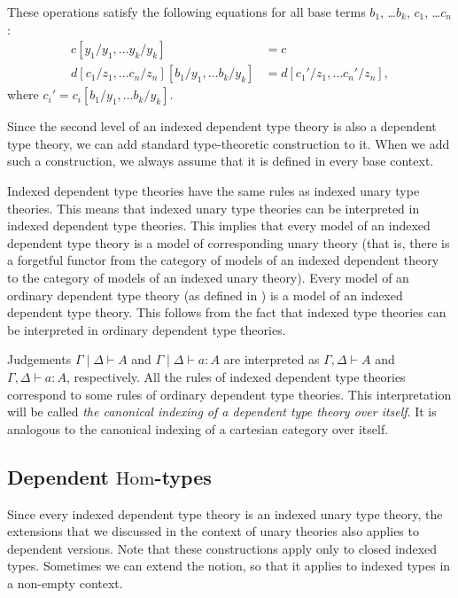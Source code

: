 \documentclass[reqno]{amsart}
\theoremstyle{definition}
\theoremstyle{remark}
\newcommand{\type}{}
\newcommand{\ob}{}
\newcommand{\fs}[1]{\mathrm{#1}}
\newcommand{\Hom}{\fs{Hom}}
\numberwithin{figure}{section}
\begin{document}
These operations satisfy the following equations for all base terms $b_1$, \ldots $b_k$, $c_1$, \ldots $c_n$:
\begin{align*}
c[y_1/y_1, \ldots y_k/y_k] & = c \\
d[c_1/z_1, \ldots c_n/z_n][b_1/y_1, \ldots b_k/y_k] & = d[c_1'/z_1, \ldots c_n'/z_n],
\end{align*}
where $c_i' = c_i[b_1/y_1, \ldots b_k/y_k]$.

Since the second level of an indexed dependent type theory is also a dependent type theory,
we can add standard type-theoretic construction to it.
When we add such a construction, we always assume that it is defined in every base context.

Indexed dependent type theories have the same rules as indexed unary type theories.
This means that indexed unary type theories can be interpreted in indexed dependent type theories.
This implies that every model of an indexed dependent type theory is a model of corresponding unary theory
(that is, there is a forgetful functor from the category of models of an indexed dependent theory to the category of models of an indexed unary theory).
Every model of an ordinary dependent type theory (as defined in \cite{alg-tt}) is a model of an indexed dependent type theory.
This follows from the fact that indexed type theories can be interpreted in ordinary dependent type theories.

Judgements $\Gamma \mid \Delta \vdash A \ob$ and $\Gamma \mid \Delta \vdash a : A$ are interpreted as $\Gamma, \Delta \vdash A \type$ and $\Gamma, \Delta \vdash a : A$, respectively.
All the rules of indexed dependent type theories correspond to some rules of ordinary dependent type theories.
This interpretation will be called \emph{the canonical indexing of a dependent type theory over itself}.
It is analogous to the canonical indexing of a cartesian category over itself.

\subsection{Dependent $\Hom$-types}

Since every indexed dependent type theory is an indexed unary type theory, the extensions that we discussed in the context of unary theories also applies to dependent versions.
Note that these constructions apply only to closed indexed types.
Sometimes we can extend the notion, so that it applies to indexed types in a non-empty context.
\end{document}
